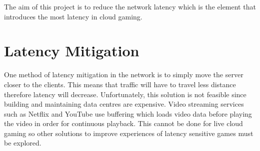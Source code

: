 The aim of this project is to reduce the network latency which is the element that introduces the most latency in cloud gaming.

\section{Latency Mitigation}
One method of latency mitigation in the network is to simply move the server closer to the clients. This means that traffic will have to travel less distance therefore latency will decrease. Unfortunately, this solution is not feasible since building and maintaining data centres are expensive. Video streaming services such as Netflix and YouTube use buffering which loads video data before playing the video in order for continuous playback. This cannot be done for live cloud gaming so other solutions to improve experiences of latency sensitive games must be explored.

